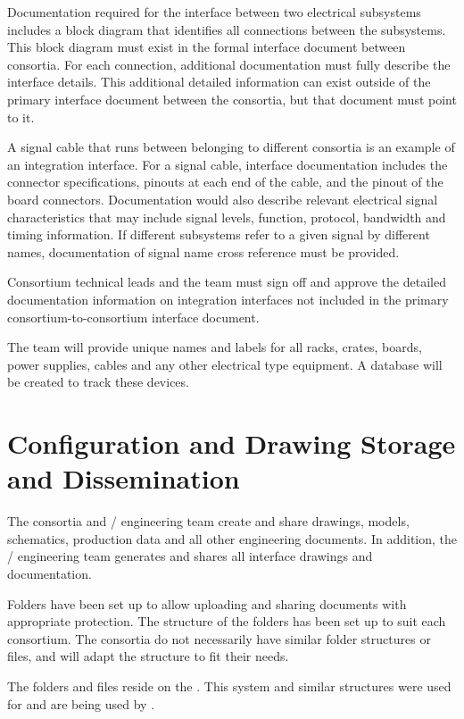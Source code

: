 Documentation required for the interface between two electrical
subsystems includes a block diagram that identifies all connections
between the subsystems.  This block diagram must exist in the formal
interface document between consortia.  For each connection, additional
documentation must fully describe the interface details. This
additional detailed information can exist outside of the primary
interface document between the consortia, but that document must point
to it.


A signal cable that runs between  belonging to different
consortia is an example of an integration interface.  For a signal
cable, interface documentation includes the connector specifications,
pinouts at each end of the cable, and the pinout of the board
connectors.  Documentation would also describe relevant electrical
signal characteristics that may include signal levels, function,
protocol, bandwidth and timing information.  If different subsystems
refer to a given signal by different names, documentation of signal
name cross reference must be provided.

Consortium technical leads and the  team must sign off
and approve the detailed documentation information on integration
interfaces not included in the primary consortium-to-consortium
interface document.

The  team will provide unique names and labels
for all racks, crates, boards, power supplies, cables and any other
electrical type equipment.  A database will be created to track these
devices.

\section{Configuration and Drawing Storage and Dissemination}
\label{sec:fdsp-coord-integ-modelplan}

The consortia and / engineering team create and share
drawings, models, schematics, production data and all other
engineering documents. In addition, the / engineering team
generates and shares all interface drawings and documentation.

Folders have been set up to allow uploading and sharing documents
with appropriate protection. The structure of the folders has been set
up to suit each consortium. The consortia do not necessarily have
similar folder structures or files, and will adapt the structure to fit
their needs.

The folders and files reside on the . This system and
similar structures were used for  and are being
used by .

